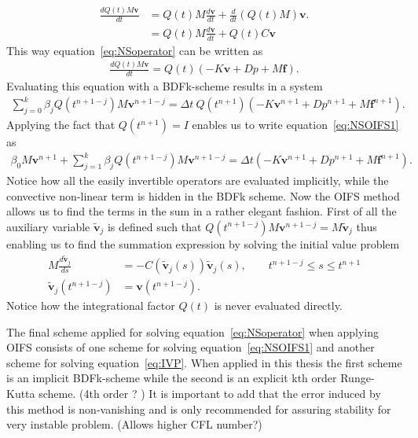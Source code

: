 \begin{align}
    \frac{dQ(t)M\mathbf{v}}{dt} &=  Q(t)M\frac{d\mathbf{v}}{dt} + \frac{d}{dt}(Q(t)M)\mathbf{v}.\\
    &= Q(t)M\frac{d\mathbf{v}}{dt} + Q(t)C\mathbf{v} 
    \label{eq:integrationalfactor}
\end{align}
%
This way equation~\ref{eq:NSoperator} can be written as 
\begin{align}
    \frac{d Q(t)M\mathbf{v}}{dt} =Q(t)( -K\mathbf{v} +D p +M\mathbf{f}).
    \label{eq:NSoperatorOIFS}
\end{align}
Evaluating this equation with a BDFk-scheme results in a system 
\begin{align}
    \sum_{j=0}^{k}\beta_jQ(t^{n+1-j})M\mathbf{v}^{n+1-j} =\Delta t \: Q(t^{n+1})( -K\mathbf{v}^{n+1} +D p^{n+1} +M\mathbf{f}^{n+1}).
    \label{eq:NSOIFS1}
\end{align}
Applying the fact that $Q(t^{n+1}) = I$ enables us to write equation~\ref{eq:NSOIFS1} as 
\begin{align}
    \beta_0M\mathbf{v}^{n+1} + \sum_{j=1}^{k}\beta_jQ(t^{n+1-j})M\mathbf{v}^{n+1-j} 
    =\Delta t ( -K\mathbf{v}^{n+1} +D p^{n+1} +M\mathbf{f}^{n+1}).
    \label{eq:NSOIFS1}
\end{align}
Notice how all the easily invertible operators are evaluated implicitly, while the convective non-linear term is hidden in the BDFk scheme. 
Now the OIFS method allows us to find the terms in the sum in a rather elegant fashion.  
First of all the auxiliary variable $\tilde{\mathbf{v}}_j$ is defined such that $Q(t^{n+1-j})M\mathbf{v}^{n+1-j} = M\tilde{\mathbf{v}}_j$ thus enabling us to find
the summation expression by solving the initial value problem 
\begin{align}
    M\frac{d\tilde{\mathbf{v}}_j}{ds} &= -C(\tilde{\mathbf{v}}_j(s))\tilde{\mathbf{v}}_j(s) , \qquad t^{n+1-j}\leq s\leq t^{n+1}\\
    \tilde{\mathbf{v}}_j(t^{n+1-j}) &= \mathbf{v}(t^{n+1-j}).
    \label{eq:IVP}
\end{align}
Notice how the integrational factor $Q(t)$ is never evaluated directly.

The final scheme applied for solving equation~\ref{eq:NSoperator} when applying OIFS consists of one scheme for solving 
equation~\ref{eq:NSOIFS1} and another scheme for solving equation~\ref{eq:IVP}. When applied in this thesis the 
first scheme is an implicit BDFk-scheme while the second is an explicit kth order Runge-Kutta scheme. (4th order ? )
It is important to add that the error induced by this method is non-vanishing and is only recommended for assuring stability 
for very instable problem. (Allows higher CFL number?)

